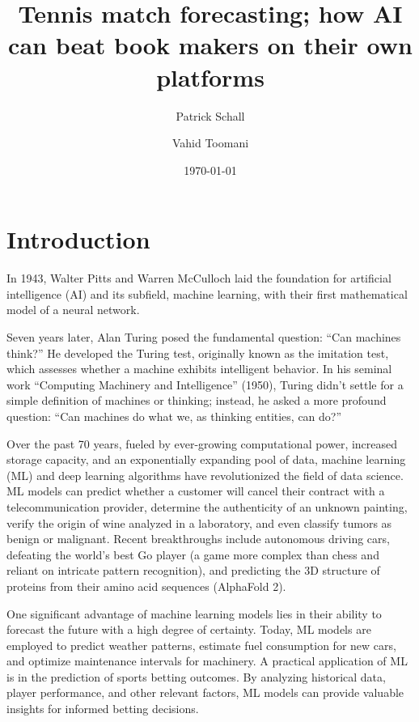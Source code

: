 \documentclass[preprint,aps,nofootinbib,a4paper,superscriptaddress,longbibliography,amsfonts,amssymb,amsmath,titlepage]{revtex4-2}
\begin{document}
\title{Tennis match forecasting; how AI can beat book makers on their own platforms}

\author{Patrick Schall}

\author{Vahid Toomani}

\date{\today}

\maketitle
\tableofcontents

\newpage

\section{Introduction}

In 1943, Walter Pitts and Warren McCulloch laid the foundation for artificial intelligence (AI) and its subfield, machine learning, with their first mathematical model of a neural network.

Seven years later, Alan Turing posed the fundamental question: ``Can machines think?'' He developed the Turing test, originally known as the imitation test, which assesses whether a machine exhibits intelligent behavior. In his seminal work ``Computing Machinery and Intelligence'' (1950), Turing didn’t settle for a simple definition of machines or thinking; instead, he asked a more profound question: ``Can machines do what we, as thinking entities, can do?''

Over the past 70 years, fueled by ever-growing computational power, increased storage capacity, and an exponentially expanding pool of data, machine learning (ML) and deep learning algorithms have revolutionized the field of data science. ML models can predict whether a customer will cancel their contract with a telecommunication provider, determine the authenticity of an unknown painting, verify the origin of wine analyzed in a laboratory, and even classify tumors as benign or malignant. Recent breakthroughs include autonomous driving cars, defeating the world’s best Go player (a game more complex than chess and reliant on intricate pattern recognition), and predicting the 3D structure of proteins from their amino acid sequences (AlphaFold 2).

One significant advantage of machine learning models lies in their ability to forecast the future with a high degree of certainty. Today, ML models are employed to predict weather patterns, estimate fuel consumption for new cars, and optimize maintenance intervals for machinery. A practical application of ML is in the prediction of sports betting outcomes. By analyzing historical data, player performance, and other relevant factors, ML models can provide valuable insights for informed betting decisions.
\end{document}
